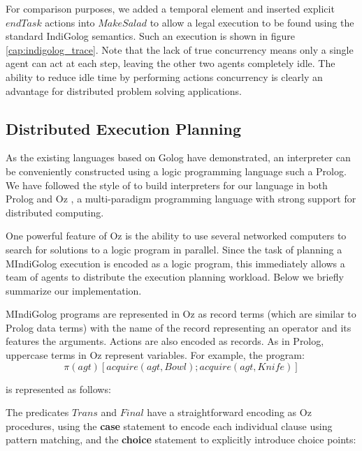 For comparison purposes, we added a temporal element and inserted
explicit $endTask$ actions into $MakeSalad$ to allow a legal execution
to be found using the standard IndiGolog semantics. Such an execution
is shown in figure \ref{cap:indigolog_trace}. Note that the lack
of true concurrency means only a single agent can act at each step,
leaving the other two agents completely idle. The ability to reduce
idle time by performing actions concurrency is clearly an advantage
for distributed problem solving applications.


\subsection{Distributed Execution Planning}

As the existing languages based on Golog have demonstrated, an interpreter
can be conveniently constructed using a logic programming language
such a Prolog. We have followed the style of \citet{giacomo00congolog,giacomo99indigolog}
to build interpreters for our language in both Prolog and Oz \citet{vanroy03mozart_logic},
a multi-paradigm programming language with strong support for distributed
computing.

One powerful feature of Oz is the ability to use several networked
computers to search for solutions to a logic program in parallel.
Since the task of planning a MIndiGolog execution is encoded as a
logic program, this immediately allows a team of agents to distribute
the execution planning workload. Below we briefly summarize our implementation.

MIndiGolog programs are represented in Oz as record terms (which are
similar to Prolog data terms) with the name of the record representing
an operator and its features the arguments. Actions are also encoded
as records. As in Prolog, uppercase terms in Oz represent variables.
For example, the program:\[
\pi(agt)\left[acquire(agt,Bowl);acquire(agt,Knife)\right]\]


is represented as follows:

{\small  }{\small \par}

The predicates $Trans$ and $Final$ have a straightforward encoding
as Oz procedures, using the \textbf{case} statement to encode each
individual clause using pattern matching, and the \textbf{choice}
statement to explicitly introduce choice points:

{\small  }{\small \par}

